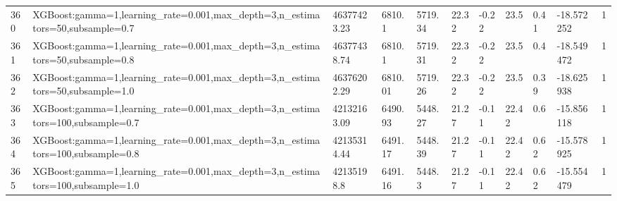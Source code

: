 \begin{longtable}{C{0.8cm} L{2cm} C{1.15cm} C{1.15cm} C{1.15cm} C{1.15cm} C{0.85cm} C{1.25cm} C{1.2cm} C{1.5cm} C{1.0cm}}
360 & XGBoost:\newline gamma=1,\newline learning\_rate=0.001,\newline max\_depth=3,\newline n\_estimators=50,\newline subsample=0.7 & 46377423.23 & 6810.1 & 5719.34 & 22.32 & -0.22 & 23.5 & 0.41 & -18.572252 & 1 \\
361 & XGBoost:\newline gamma=1,\newline learning\_rate=0.001,\newline max\_depth=3,\newline n\_estimators=50,\newline subsample=0.8 & 46377438.74 & 6810.1 & 5719.31 & 22.32 & -0.22 & 23.5 & 0.4 & -18.549472 & 1 \\
362 & XGBoost:\newline gamma=1,\newline learning\_rate=0.001,\newline max\_depth=3,\newline n\_estimators=50,\newline subsample=1.0 & 46376202.29 & 6810.01 & 5719.26 & 22.32 & -0.22 & 23.5 & 0.39 & -18.625938 & 1 \\
363 & XGBoost:\newline gamma=1,\newline learning\_rate=0.001,\newline max\_depth=3,\newline n\_estimators=100,\newline subsample=0.7 & 42132163.09 & 6490.93 & 5448.27 & 21.27 & -0.11 & 22.42 & 0.6 & -15.856118 & 1 \\
364 & XGBoost:\newline gamma=1,\newline learning\_rate=0.001,\newline max\_depth=3,\newline n\_estimators=100,\newline subsample=0.8 & 42135314.44 & 6491.17 & 5448.39 & 21.27 & -0.11 & 22.42 & 0.62 & -15.578925 & 1 \\
365 & XGBoost:\newline gamma=1,\newline learning\_rate=0.001,\newline max\_depth=3,\newline n\_estimators=100,\newline subsample=1.0 & 42135198.8 & 6491.16 & 5448.3 & 21.27 & -0.11 & 22.42 & 0.62 & -15.554479 & 1 \\

\end{longtable}
